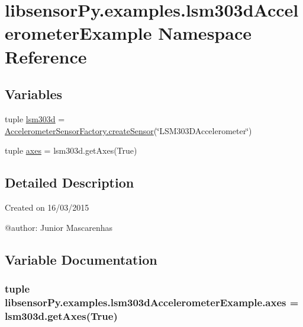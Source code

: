 \hypertarget{namespacelibsensorPy_1_1examples_1_1lsm303dAccelerometerExample}{}\section{libsensor\+Py.\+examples.\+lsm303d\+Accelerometer\+Example Namespace Reference}
\label{namespacelibsensorPy_1_1examples_1_1lsm303dAccelerometerExample}
\subsection*{Variables}
\begin{DoxyCompactItemize}
\item 
tuple \hyperlink{namespacelibsensorPy_1_1examples_1_1lsm303dAccelerometerExample_aa5ac31375b1cbeb0477d86f02278eba6}{lsm303d} = \hyperlink{classconcretefactory_1_1accelerometerSensorFactory_1_1AccelerometerSensorFactory_acc779765811f2da3b7a212550936b63b}{Accelerometer\+Sensor\+Factory.\+create\+Sensor}(\char`\"{}L\+S\+M303\+D\+Accelerometer\char`\"{})
\item 
tuple \hyperlink{namespacelibsensorPy_1_1examples_1_1lsm303dAccelerometerExample_a6c68ebd35890a81a4ec00f816cb378d7}{axes} = lsm303d.\+get\+Axes(True)
\end{DoxyCompactItemize}


\subsection{Detailed Description}
\begin{DoxyVerb}Created on 16/03/2015

@author: Junior Mascarenhas
\end{DoxyVerb}
 

\subsection{Variable Documentation}
\hypertarget{namespacelibsensorPy_1_1examples_1_1lsm303dAccelerometerExample_a6c68ebd35890a81a4ec00f816cb378d7}{}
\subsubsection[{axes}]{\setlength{\rightskip}{0pt plus 5cm}tuple libsensor\+Py.\+examples.\+lsm303d\+Accelerometer\+Example.\+axes = lsm303d.\+get\+Axes(True)}\label{namespacelibsensorPy_1_1examples_1_1lsm303dAccelerometerExample_a6c68ebd35890a81a4ec00f816cb378d7}
\hypertarget{namespacelibsensorPy_1_1examples_1_1lsm303dAccelerometerExample_aa5ac31375b1cbeb0477d86f02278eba6}{}
